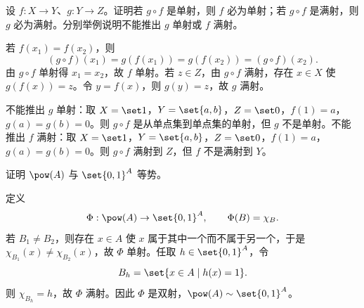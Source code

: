 \begin{exercise}[level=advanced]
设 $f:X\to Y$、$g:Y\to Z$。证明若 $g\circ f$ 是单射，则 $f$ 必为单射；若 $g\circ f$ 是满射，则 $g$ 必为满射。分别举例说明不能推出 $g$ 单射或 $f$ 满射。
\begin{solution}
若 $f(x_1)=f(x_2)$，则
  \[
  (g\circ f)(x_1)=g(f(x_1))=g(f(x_2))=(g\circ f)(x_2).
  \]
  由 $g\circ f$ 单射得 $x_1=x_2$，故 $f$ 单射。若 $z\in Z$，由 $g\circ f$ 满射，存在 $x\in X$ 使 $g(f(x))=z$。令 $y=f(x)$，则 $g(y)=z$，故 $g$ 满射。

  不能推出 $g$ 单射：取 $X=\set1$，$Y=\set{a,b}$，$Z=\set0$，$f(1)=a$，$g(a)=g(b)=0$。则 $g\circ f$ 是从单点集到单点集的单射，但 $g$ 不是单射。不能推出 $f$ 满射：取 $X=\set1$，$Y=\set{a,b}$，$Z=\set0$，$f(1)=a$，$g(a)=g(b)=0$。则 $g\circ f$ 满射到 $Z$，但 $f$ 不是满射到 $Y$。
\end{solution}
\end{exercise}

\begin{exercise}[level=advanced]
证明 $\pow(A)$ 与 $\set{0,1}^A$ 等势。
\begin{solution}
定义
  \[
  \Phi:\pow(A)\to\set{0,1}^A,\qquad \Phi(B)=\chi_B.
  \]
  若 $B_1\ne B_2$，则存在 $x\in A$ 使 $x$ 属于其中一个而不属于另一个，于是 $\chi_{B_1}(x)\ne\chi_{B_2}(x)$，故 $\Phi$ 单射。任取 $h\in\set{0,1}^A$，令
  \[
  B_h=\set{x\in A\mid h(x)=1}.
  \]
  则 $\chi_{B_h}=h$，故 $\Phi$ 满射。因此 $\Phi$ 是双射，$\pow(A)\sim\set{0,1}^A$。
\end{solution}
\end{exercise}

